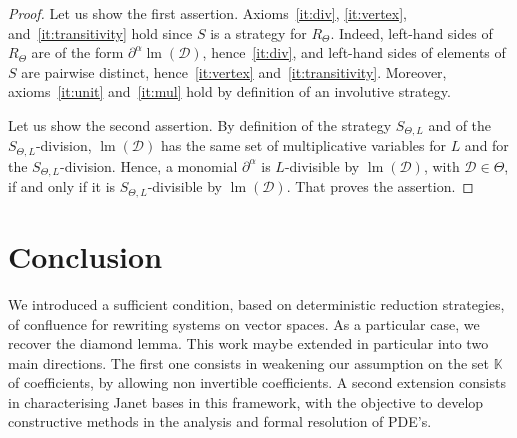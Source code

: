 \documentclass[10pt]{easychair}
\theoremstyle{definition}
\newcommand\D{\mathcal{D}}
\DeclareMathOperator{\lm}{lm}
\newcommand\K{\mathbb{K}}
\newcommand\RTheta{R_{\Theta}}
\newcommand\SThetaL{S_{\Theta,L}}
\begin{document}
\begin{proof}
  Let us show the first assertion. Axioms~\ref{it:div}, \ref{it:vertex},
  and~\ref{it:transitivity} hold since $S$ is a strategy for $\RTheta$.
  Indeed, left-hand sides of $\RTheta$ are of the form
  $\partial^\alpha\lm(\D)$, hence~\ref{it:div}, and left-hand sides of
  elements of $S$ are pairwise distinct, hence~\ref{it:vertex}
  and~\ref{it:transitivity}. Moreover, axioms~\ref{it:unit}
  and~\ref{it:mul} hold by definition of an involutive strategy.

  Let us show the second assertion. By definition of the strategy
  $\SThetaL$ and of the $\SThetaL$-division, $\lm(\D)$ has the same set
  of multiplicative variables for $L$ and for the $\SThetaL$-division.
  Hence, a monomial $\partial^\alpha$ is $L$-divisible by $\lm(\D)$, with
  $\D\in\Theta$, if and only if it is $\SThetaL$-divisible by $\lm(\D)$.
  That proves the assertion.
\end{proof}

\section{Conclusion}

We introduced a sufficient condition,
based on deterministic reduction strategies, of confluence for
rewriting systems on vector spaces. As a particular case,
we recover the diamond lemma. This work maybe extended in particular
into two main directions. The first one consists in weakening our assumption
on the set $\K$ of coefficients, by allowing non invertible coefficients.
A second extension consists in characterising Janet bases in this framework,
with the objective to develop constructive methods in the analysis and formal
resolution of PDE's.


\end{document}
